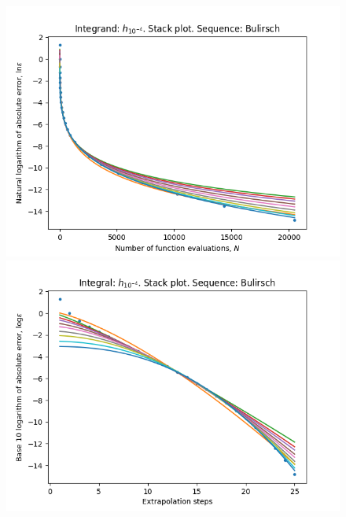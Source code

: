 \begin{figure}[H]
\centering
\begin{minipage}{0.45\textwidth}
\centering
\includegraphics[scale=0.45]{../results/romberg_plots/h_tenthousandth_hp_bulirsch_stack.png}
\end{minipage}
\begin{minipage}{0.45\textwidth}
\centering
\includegraphics[scale=0.45]{../results/romberg_plots/h_tenthousandth_hp_bulirsch_steps_stack.png}
\end{minipage}
\end{figure}

